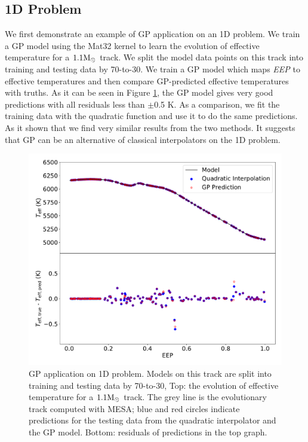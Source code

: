 \subsection{1D Problem}

We first demonstrate an example of GP application on an 1D problem. We train a GP model using the Mat32 kernel to learn the evolution of effective temperature for a $\rm 1.1M_{\odot}$ track. 
%
We split the model data points on this track into training and testing data by 70-to-30. We train a GP model which maps  {\it EEP} to effective temperatures and then compare GP-predicted effective temperatures with truths. As it can be seen in Figure \ref{fig:1dgp}, the GP model gives very good predictions with all residuals less than $\pm$0.5 K. As a comparison, we fit the training data with the quadratic function and use it to do the same predictions. As it shown that we find very similar results from the two methods. It suggests that GP can be an alternative of classical interpolators on the 1D problem. 

\begin{figure}
	\includegraphics[width=1.0\columnwidth]{1d-gp.pdf}
    \caption{GP application on 1D problem. Models on this track are split into training and testing data by 70-to-30, Top: the evolution of effective temperature for a $\rm 1.1M_{\odot}$ track. The grey line is the evolutionary track computed with \textsc{MESA}; blue and red circles indicate predictions for the testing data from the quadratic interpolator and the GP model. Bottom: residuals of predictions in the top graph. }  
    \label{fig:1dgp}
\end{figure}

